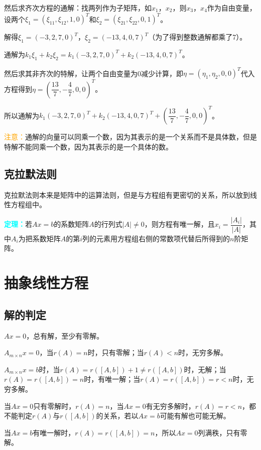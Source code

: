 \documentclass[UTF8, 12pt]{ctexart}
\begin{document}
然后求齐次方程的通解：找两列作为子矩阵，如$x_1$，$x_2$，则$x_3$，$x_4$作为自由变量，设两个$\xi_1=(\xi_{11},\xi_{12},1,0)^T$和$\xi_2=(\xi_{21},\xi_{22},0,1)^T$。

解得$\xi_1=(-3,2,7,0)^T$，$\xi_2=(-13,4,0,7)^T$（为了得到整数通解都乘了7）。

通解为$k_1\xi_1+k_2\xi_2=k_1(-3,2,7,0)^T+k_2(-13,4,0,7)^T$。

然后求其非齐次的特解，让两个自由变量为0减少计算，即$\eta=(\eta_1,\eta_2,0,0)^T$代入方程得到$\eta=\left(\dfrac{13}{7},-\dfrac{4}{7},0,0\right)^T$。

所以通解为$k_1(-3,2,7,0)^T+k_2(-13,4,0,7)^T+\left(\dfrac{13}{7},-\dfrac{4}{7},0,0\right)^T$。

\textcolor{orange}{注意：}通解的向量可以同乘一个数，因为其表示的是一个关系而不是具体数，但是特解不能同乘一个数，因为其表示的是一个具体的数。

\subsection{克拉默法则}

克拉默法则本来是矩阵中的运算法则，但是与方程组有更密切的关系，所以放到线性方程组中。

\textcolor{aqua}{\textbf{定理：}}若$Ax=b$的系数矩阵$A$的行列式$\vert A\vert\neq0$，则方程有唯一解，且$x_i=\dfrac{\vert A_i\vert}{\vert A\vert}$，其中$A_i$为把系数矩阵$A$的第$i$列的元素用方程组右侧的常数项代替后所得到的$n$阶矩阵。

\section{抽象线性方程}

\subsection{解的判定}

$Ax=0$，总有解，至少有零解。

$A_{m\times n}x=0$，当$r(A)=n$时，只有零解；当$r(A)<n$时，无穷多解。

$A_{m\times n}x=b$时，当$r(A)=r([A,b])+1\neq r([A,b])$时，无解；当$r(A)=r([A,b])=n$时，有唯一解；当$r(A)=r([A,b])=r<n$时，无穷多解。

当$Ax=0$只有零解时，$r(A)=n$，当$Ax=0$有无穷多解时，$r(A)=r<n$，都不能判定$r(A)$与$r([A,b])$的关系，若以$Ax=b$可能有解也可能无解。

当$Ax=b$有唯一解时，$r(A)=r([A,b])=n$，所以$Ax=0$列满秩，只有零解。
\end{document}
